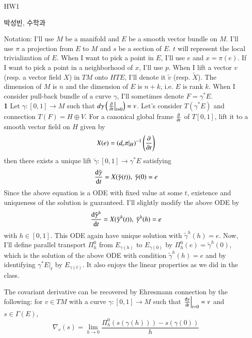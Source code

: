 \documentclass[a4paper, 12pt]{article}
\theoremstyle{Mydefinition}
\theoremstyle{Mytheorem}
\begin{document}
\thispagestyle{myfirstpage}
\begin{center}
	\Large{HW1}
\end{center}
박성빈, 수학과

Notation: I'll use $M$ be a manifold and $E$ be a smooth vector bundle on $M$. I'll use $\pi$ a projection from $E$ to $M$ and $s$ be a section of $E$. $t$ will represent the local trivialization of $E$. When I want to pick a point in $E$, I'll use $e$ and $x = \pi(e)$. If I want to pick a point in a neighborhood of $x$, I'll use $p$. When I lift a vector $v$ (resp. a vector field $X$) in $TM$ onto $HTE$, I'll denote it $\tilde{v}$ (resp. $\tilde{X}$). The dimension of $M$ is $n$ and the dimension of $E$ is $n+k$, i.e. $E$ is rank $k$. When I consider pull-back bundle of a curve $\gamma$, I'll sometimes denote $F=\gamma^*E$.\\

\noindent \textbf{1}
Let $\gamma:[0,1]\rightarrow M$ such that $d\gamma\left(\left.\pdv{t}\right|_{t=0}\right) = v$. Let's consider $T(\gamma^*E)$ and connection $T(F) = H\oplus V$. For a canonical global frame $\pdv{t}$ of $T[0,1]$, lift it to a smooth vector field on $H$ given by
\begin{equation*}
    X(e) = (d_e\pi|_H)^{-1}\left(\pdv{t}\right)
\end{equation*}
then there exists a unique lift $\tilde{\gamma}:[0,1]\rightarrow \gamma^*E$ satisfying 
\begin{equation*}
    \dv{\tilde{\gamma}}{t} = X(\tilde{\gamma}(t)),~\tilde{\gamma}(0) = e
\end{equation*}
Since the above equation is a ODE with fixed value at some $t$, existence and uniqueness of the solution is guaranteed. I'll slightly modify the above ODE by
\begin{equation}\label{Eq:1_1}
    \dv{\tilde{\gamma}^h}{t} = X(\tilde{\gamma}^h(t)),~\tilde{\gamma}^h(h) = e
\end{equation}
with $h\in [0,1]$. This ODE again have unique solution with $\tilde{\gamma}^h(h) = e$. Now, I'll define parallel transport $\Pi_h^0$ from $E_{\gamma(h)}$ to $E_{\gamma(0)}$ by $\Pi_h^0(e) = \tilde{\gamma}^h(0)$, which is the solution of the above ODE with condition $\tilde{\gamma}^h(h) = e$ and by identifying $\gamma^*E|_t$ by $E_{\gamma(t)}$. It also enjoys the linear properties as we did in the class.

The covariant derivative can be recovered by Ehresmann connection by the following: for $v\in TM$ with a curve $\gamma:[0,1]\rightarrow M$ such that $\left.\dv{\gamma}{t}\right|_{t=0} = v$ and $s\in \Gamma(E)$,
\begin{equation*}
    \nabla_v (s) = \lim_{h\rightarrow 0}\frac{\Pi^0_h (s(\gamma(h)))-s(\gamma(0))}{h}
\end{equation*}
\end{document}
